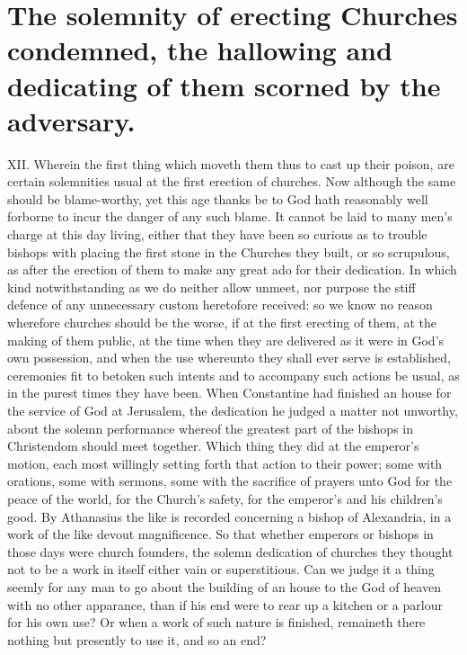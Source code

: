 \section*{The solemnity of erecting Churches condemned, the hallowing and dedicating of them scorned by the adversary.}
XII. Wherein the first thing which moveth them thus to cast up their poison, are certain solemnities usual at the first erection of churches. Now although the same should be blame-worthy, yet this age thanks be to God hath reasonably well forborne to incur the danger of any such blame. It cannot be laid to many men’s charge at this day living, either that they have been so curious as to trouble bishops with placing the first stone in the Churches they built, or so scrupulous, as after the erection of them to make any great ado for their dedication. In which kind notwithstanding as we do neither allow unmeet, nor purpose the stiff defence of any unnecessary custom heretofore received: so we know  no reason wherefore churches should be the worse, if at the first erecting of them, at the making of them public, at the time when they are delivered as it were in God’s own possession, and when the use whereunto they shall ever serve is established, ceremonies fit to betoken such intents and to accompany such actions be usual, as in the purest times they have been. When Constantine had finished an house for the service of God at Jerusalem, the dedication he judged a matter not unworthy, about the solemn performance whereof the greatest part of the bishops in Christendom should meet together. Which thing they did at the emperor’s motion, each most willingly setting forth that action to their power; some with orations, some with sermons, some with the sacrifice of prayers unto God for the peace of the world, for the Church’s safety, for the emperor’s and his children’s good. By Athanasius the like is recorded concerning a bishop of Alexandria, in a work of the like devout magnificence. So that whether emperors or bishops in those days were church founders, the solemn dedication of churches they thought not to be a work in itself either vain or superstitious. Can we judge it a thing seemly for any man to go about the building of an house to  the God of heaven with no other apparance, than if his end were to rear up a kitchen or a parlour for his own use?
 Or when a work of such nature is finished, remaineth there nothing but presently to use it, and so an end?

